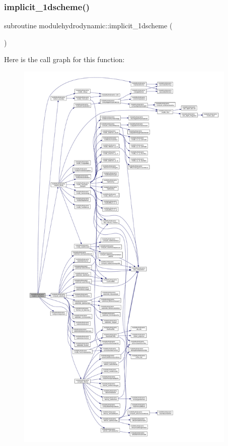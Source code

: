 \subsubsection{\texorpdfstring{implicit\+\_\+1dscheme()}{implicit\_1dscheme()}}
{\footnotesize\ttfamily subroutine modulehydrodynamic\+::implicit\+\_\+1dscheme (\begin{DoxyParamCaption}{ }\end{DoxyParamCaption})\hspace{0.3cm}{\ttfamily [private]}}

Here is the call graph for this function\+:\nopagebreak
\begin{figure}[H]
\begin{center}
\leavevmode
\includegraphics[height=550pt]{namespacemodulehydrodynamic_aad271ff300fe974ab4d13ed6f1bd315d_cgraph}
\end{center}
\end{figure}
